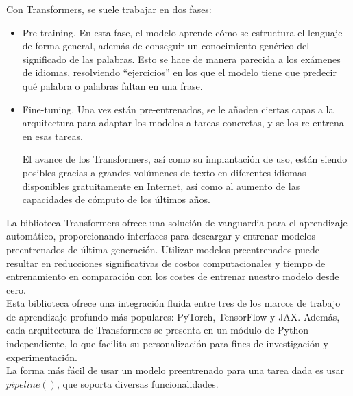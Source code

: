 Con Transformers, se suele trabajar en dos fases:
\begin{itemize}
\item Pre-training. En esta fase, el modelo aprende cómo se estructura el lenguaje de forma general, además de conseguir un conocimiento genérico del significado de las palabras. Esto se hace de manera parecida a los exámenes de idiomas, resolviendo “ejercicios” en los que el modelo tiene que predecir qué palabra o palabras faltan en una frase.
\item Fine-tuning. Una vez están pre-entrenados, se le añaden ciertas capas a la arquitectura para adaptar los modelos a tareas concretas, y se los re-entrena en esas tareas.

El avance de los Transformers, así como su implantación de uso, están siendo posibles gracias a grandes volúmenes de texto en diferentes idiomas disponibles gratuitamente en Internet, así como al aumento de las capacidades de cómputo de los últimos años.
\end{itemize}
La biblioteca Transformers ofrece una solución de vanguardia para el aprendizaje automático, proporcionando interfaces para descargar y entrenar modelos preentrenados de última generación. Utilizar modelos preentrenados puede resultar en reducciones significativas de costos computacionales y tiempo de entrenamiento en comparación con los costes de entrenar nuestro modelo desde cero. \\

Esta biblioteca ofrece una integración fluida entre tres de los marcos de trabajo de aprendizaje profundo más populares: PyTorch, TensorFlow y JAX. Además, cada arquitectura de Transformers se presenta en un módulo de Python independiente, lo que facilita su personalización para fines de investigación y experimentación.\\

La forma más fácil de usar un modelo preentrenado para una tarea dada es usar $pipeline()$, que soporta diversas funcionalidades. \\


